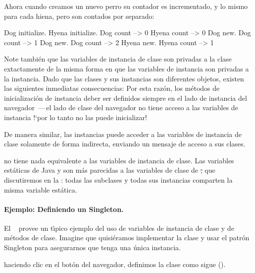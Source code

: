 \documentclass[a4paper,10pt,twoside]{book}
\begin{document}
Ahora cuando creamos un nuevo perro su contador es incrementado, y lo mismo para cada hiena, pero son contados por separado:

\begin{code}{}
Dog initialize.
Hyena initialize.
Dog count     --> 0
Hyena count --> 0
Dog new.
Dog count     --> 1
Dog new.
Dog count     --> 2
Hyena new.
Hyena count --> 1
\end{code}

Note tambi\'en que las variables de instancia de clase son privadas a la clase extactamente de la misma forma en que las variables de instancia son privadas a la instancia. 
Dado que las clases y sus instancias son diferentes objetos, existen las siguientes inmediatas consecuencias:
Por esta raz\'on, los m\'etodos de inicializaci\'on de instancia deber ser definidos siempre en el lado de instancia del navegador
\,---\,el lado de clase del navegador no tiene acceso a las variables de instancia !`por lo tanto no las puede inicializar! 

De manera similar, las instancias puede acceder a las variables de instancia de clase solamente de forma indirecta, enviando un mensaje de acceso a sus clases. 

 no tiene nada equivalente a las variables de instancia de clase. 
Las variables est\'aticas de Java y  son m\'as parecidas a las variables de clase de \st, que discutiremos en la : todas las subclases y todas sus instancias comparten la misma variable est\'atica.


\paragraph{Ejemplo: Definiendo un Singleton.}
El ~\cite{Alpe98a} provee un t\'\i{}pico ejemplo del uso de variables de instancia de clase y de m\'etodos de clase.
Imagine que quisi\'eramos implementar la clase  y usar el patr\'on Singleton para asegurarnos que tenga una \'unica instancia. 

haciendo clic en el bot\'on  del navegador, definimos la clase  como sigue (). 
\end{document}
